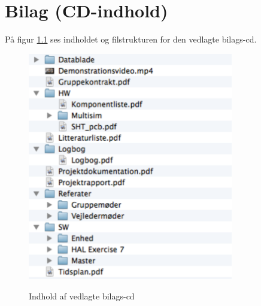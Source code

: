 \chapter{Bilag (CD-indhold)}

På figur \ref{fig:bilag-cd} ses indholdet og filstrukturen for den vedlagte bilags-cd.

\begin{figure}[H]
\centering
{\includegraphics[width=0.8\textwidth]{filer/cd-bilag}}
\caption{Indhold af vedlagte bilags-cd}
\label{fig:bilag-cd}
\end{figure}
